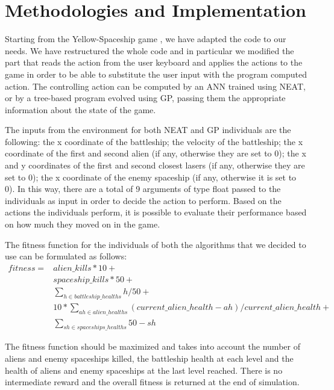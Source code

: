 \section{Methodologies and Implementation}

Starting from the Yellow-Spaceship game \cite{Yellow-Spaceship}, we have adapted the code to our needs. We
have restructured the whole code and in particular we modified the part that reads the action
from the user keyboard and applies the actions to the game in order to be able to substitute
the user input with the program computed action. The controlling action can be computed by
an ANN trained using NEAT, or by a tree-based program evolved using GP, passing them
the appropriate information about the state of the game.

The inputs from the environment for both NEAT and GP individuals are the following:
the x coordinate of the battleship; the velocity of the battleship;
the x coordinate of the first and second alien (if any, otherwise they are set to 0);
the x and y coordinates of the first and second closest lasers (if any, otherwise they are set to 0);
the x coordinate of the enemy spaceship (if any, otherwise it is set to 0).
In this way, there are a total of 9 arguments of type float passed to the individuals as input in
order to decide the action to perform. Based on the actions the individuals perform, it is
possible to evaluate their performance based on how much they moved on in the game.

The fitness function for the individuals of both the algorithms that we decided to use can be
formulated as follows:
\begin{equation}
\begin{split}
    fitness = & alien\_kills * 10 + \\
              & spaceship\_kills * 50 + \\
              & \sum_{h \in battleship\_healths}^{} h / 50 + \\
              & 10 * \sum_{ah \in alien\_healths}^{} (current\_alien\_health - ah) / current\_alien\_health + \\
              & \sum_{sh \in spaceships\_healths}^{} 50 - sh
\end{split}
\end{equation}

The fitness function should be maximized and takes into account the number of aliens and
enemy spaceships killed, the battleship health at each level and the health of aliens and
enemy spaceships at the last level reached. There is no intermediate reward and the overall
fitness is returned at the end of simulation.

